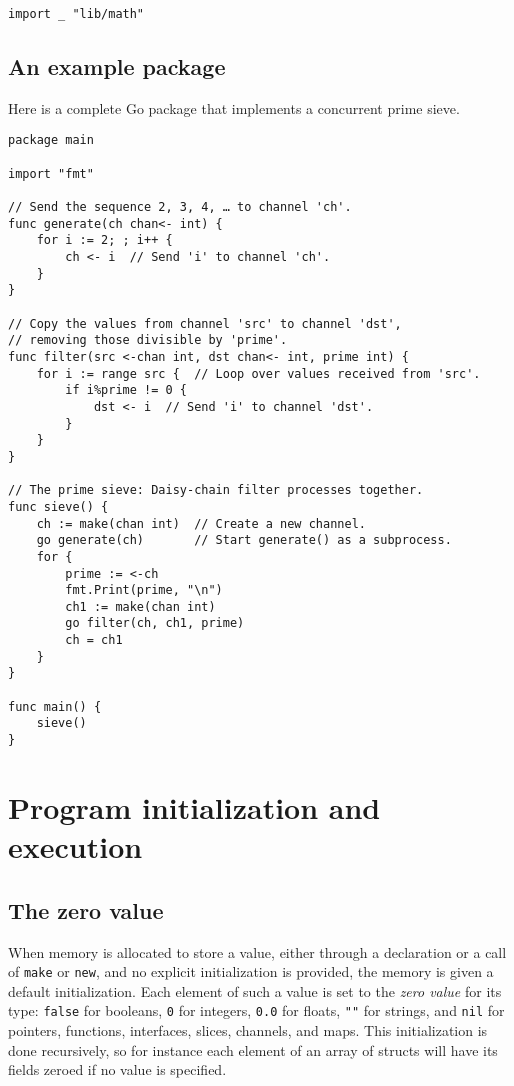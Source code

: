 {\begin{Verbatim}[frame=single]
import _ "lib/math"
\end{Verbatim}

\subsection*{An example package}

Here is a complete Go package that implements a concurrent prime sieve.

\begin{Verbatim}[frame=single]
package main

import "fmt"

// Send the sequence 2, 3, 4, … to channel 'ch'.
func generate(ch chan<- int) {
    for i := 2; ; i++ {
        ch <- i  // Send 'i' to channel 'ch'.
    }
}

// Copy the values from channel 'src' to channel 'dst',
// removing those divisible by 'prime'.
func filter(src <-chan int, dst chan<- int, prime int) {
    for i := range src {  // Loop over values received from 'src'.
        if i%prime != 0 {
            dst <- i  // Send 'i' to channel 'dst'.
        }
    }
}

// The prime sieve: Daisy-chain filter processes together.
func sieve() {
    ch := make(chan int)  // Create a new channel.
    go generate(ch)       // Start generate() as a subprocess.
    for {
        prime := <-ch
        fmt.Print(prime, "\n")
        ch1 := make(chan int)
        go filter(ch, ch1, prime)
        ch = ch1
    }
}

func main() {
    sieve()
}
\end{Verbatim}

\section*{Program initialization and execution}

\subsection*{The zero value}

When memory is allocated to store a value, either through a declaration
or a call of \texttt{make} or \texttt{new}, and no explicit
initialization is provided, the memory is given a default
initialization. Each element of such a value is set to the \emph{zero
value} for its type: \texttt{false} for booleans, \texttt{0} for
integers, \texttt{0.0} for floats, \texttt{""} for strings, and
\texttt{nil} for pointers, functions, interfaces, slices, channels, and
maps. This initialization is done recursively, so for instance each
element of an array of structs will have its fields zeroed if no value
is specified.

}
